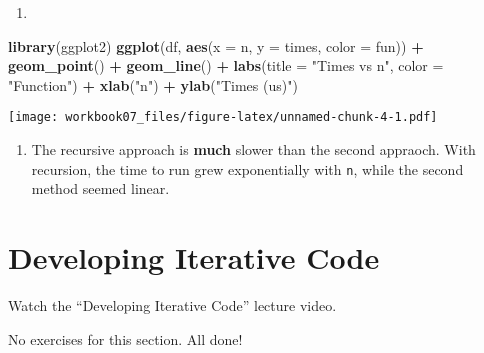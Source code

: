 \documentclass[
]{article}
\newenvironment{Shaded}{\begin{snugshade}}{\end{snugshade}}
\newcommand{\DataTypeTok}[1]{\textcolor[rgb]{0.13,0.29,0.53}{#1}}
\newcommand{\KeywordTok}[1]{\textcolor[rgb]{0.13,0.29,0.53}{\textbf{#1}}}
\newcommand{\NormalTok}[1]{#1}
\newcommand{\OperatorTok}[1]{\textcolor[rgb]{0.81,0.36,0.00}{\textbf{#1}}}
\newcommand{\StringTok}[1]{\textcolor[rgb]{0.31,0.60,0.02}{#1}}
\providecommand{\tightlist}{%
  \setlength{\itemsep}{0pt}\setlength{\parskip}{0pt}}
\begin{document}
\begin{enumerate}
\def\labelenumi{\arabic{enumi}.}
\setcounter{enumi}{2}
\tightlist
\item
\end{enumerate}

\begin{Shaded}
\begin{Highlighting}[]
\KeywordTok{library}\NormalTok{(ggplot2)}
\KeywordTok{ggplot}\NormalTok{(df, }\KeywordTok{aes}\NormalTok{(}\DataTypeTok{x =}\NormalTok{ n, }\DataTypeTok{y =}\NormalTok{ times, }\DataTypeTok{color =}\NormalTok{ fun)) }\OperatorTok{+}\StringTok{ }\KeywordTok{geom\_point}\NormalTok{() }\OperatorTok{+}\StringTok{ }\KeywordTok{geom\_line}\NormalTok{() }\OperatorTok{+}
\StringTok{   }\KeywordTok{labs}\NormalTok{(}\DataTypeTok{title =} \StringTok{"Times vs n"}\NormalTok{, }\DataTypeTok{color =} \StringTok{"Function"}\NormalTok{) }\OperatorTok{+}
\StringTok{   }\KeywordTok{xlab}\NormalTok{(}\StringTok{"n"}\NormalTok{) }\OperatorTok{+}\StringTok{ }\KeywordTok{ylab}\NormalTok{(}\StringTok{"Times (us)"}\NormalTok{)}
\end{Highlighting}
\end{Shaded}

\texttt{[image: workbook07\_files/figure-latex/unnamed-chunk-4-1.pdf]}

\begin{enumerate}
\def\labelenumi{\arabic{enumi}.}
\setcounter{enumi}{3}
\tightlist
\item
  The recursive approach is \textbf{much} slower than the second
  appraoch. With recursion, the time to run grew exponentially with
  \texttt{n}, while the second method seemed linear.
\end{enumerate}

\hypertarget{developing-iterative-code}{%
\section{Developing Iterative Code}\label{developing-iterative-code}}

Watch the ``Developing Iterative Code'' lecture video.

No exercises for this section. All done!
\end{document}
